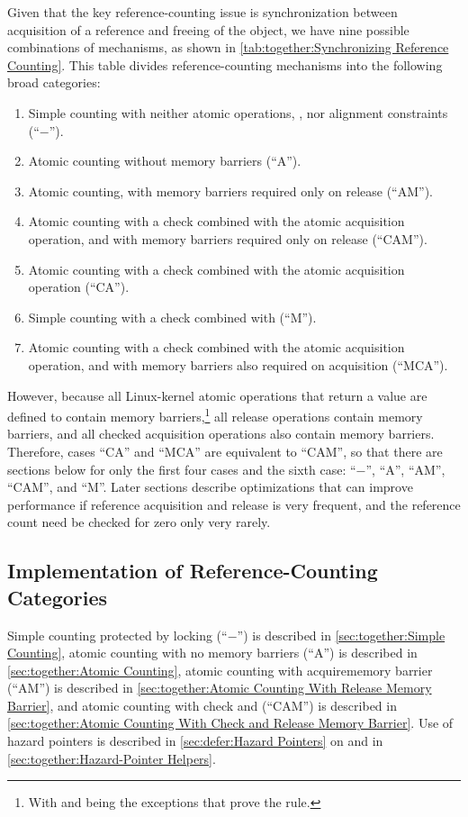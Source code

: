 Given that the key reference-counting issue
is synchronization between acquisition
of a reference and freeing of the object, we have nine possible
combinations of mechanisms, as shown in
\cref{tab:together:Synchronizing Reference Counting}.
This table
divides reference-counting mechanisms into the following broad categories:
\begin{enumerate}
\item	Simple counting with neither atomic operations, , nor alignment constraints (``$-$'').
\item	Atomic counting without memory barriers (``A'').
\item	Atomic counting, with memory barriers required only on release
	(``AM'').
\item	Atomic counting with a check combined with the atomic acquisition
	operation, and with memory barriers required only on release
	(``CAM'').
\item	Atomic counting with a check combined with the atomic acquisition
	operation (``CA'').
\item	Simple counting with a check combined with 
	(``M'').
\item	Atomic counting with a check combined with the atomic acquisition
	operation, and with memory barriers also required on acquisition
	(``MCA'').
\end{enumerate}
However, because all Linux-kernel atomic operations that return a
value are defined to contain memory barriers,\footnote{
	With  and  being the
	exceptions that prove the rule.}
all release operations
contain memory barriers, and all checked acquisition operations also
contain memory barriers.
Therefore, cases ``CA'' and ``MCA'' are equivalent to ``CAM'', so that
there are sections below for only the first four cases and the sixth case:
``$-$'', ``A'', ``AM'', ``CAM'', and ``M''.
Later sections describe optimizations that can improve performance
if reference acquisition and release is very frequent, and the
reference count need be checked for zero only very rarely.

\subsection{Implementation of Reference-Counting Categories}
\label{sec:together:Implementation of Reference-Counting Categories}

Simple counting protected by locking (``$-$'') is described in
\cref{sec:together:Simple Counting},
atomic counting with no memory barriers (``A'') is described in
\cref{sec:together:Atomic Counting},
atomic counting with 
{acquire}{memory barrier} (``AM'') is described in
\cref{sec:together:Atomic Counting With Release Memory Barrier},
and
atomic counting with check and  (``CAM'') is described in
\cref{sec:together:Atomic Counting With Check and Release Memory Barrier}.
Use of hazard pointers is described in
\cref{sec:defer:Hazard Pointers}
on 
and in
\cref{sec:together:Hazard-Pointer Helpers}.

